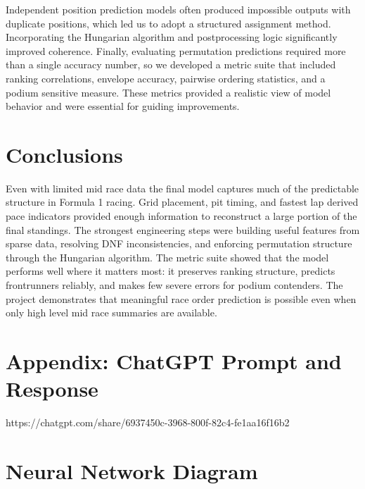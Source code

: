 \documentclass[12pt]{article}
\begin{document}
Independent position prediction models often produced impossible outputs with duplicate positions, which led us to adopt a structured assignment method. Incorporating the Hungarian algorithm and postprocessing logic significantly improved coherence. Finally, evaluating permutation predictions required more than a single accuracy number, so we developed a metric suite that included ranking correlations, envelope accuracy, pairwise ordering statistics, and a podium sensitive measure. These metrics provided a realistic view of model behavior and were essential for guiding improvements.

\section{Conclusions}

Even with limited mid race data the final model captures much of the predictable structure in Formula 1 racing. Grid placement, pit timing, and fastest lap derived pace indicators provided enough information to reconstruct a large portion of the final standings. The strongest engineering steps were building useful features from sparse data, resolving DNF inconsistencies, and enforcing permutation structure through the Hungarian algorithm. The metric suite showed that the model performs well where it matters most: it preserves ranking structure, predicts frontrunners reliably, and makes few severe errors for podium contenders. The project demonstrates that meaningful race order prediction is possible even when only high level mid race summaries are available.

\section*{Appendix: ChatGPT Prompt and Response}

https://chatgpt.com/share/6937450c-3968-800f-82c4-fe1aa16f16b2

\section{Neural Network Diagram}
\end{document}
